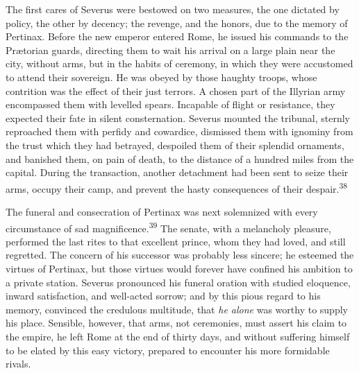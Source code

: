 The first cares of Severus were bestowed on two measures, the one
dictated by policy, the other by decency; the revenge, and the
honors, due to the memory of Pertinax. Before the new emperor
entered Rome, he issued his commands to the Prætorian guards,
directing them to wait his arrival on a large plain near the
city, without arms, but in the habits of ceremony, in which they
were accustomed to attend their sovereign. He was obeyed by those
haughty troops, whose contrition was the effect of their just
terrors. A chosen part of the Illyrian army encompassed them with
levelled spears. Incapable of flight or resistance, they expected
their fate in silent consternation. Severus mounted the tribunal,
sternly reproached them with perfidy and cowardice, dismissed
them with ignominy from the trust which they had betrayed,
despoiled them of their splendid ornaments, and banished them, on
pain of death, to the distance of a hundred miles from the
capital. During the transaction, another detachment had been sent
to seize their arms, occupy their camp, and prevent the hasty
consequences of their despair.\textsuperscript{38}


The funeral and consecration of Pertinax was next solemnized with
every circumstance of sad magnificence.\textsuperscript{39} The senate, with a
melancholy pleasure, performed the last rites to that excellent
prince, whom they had loved, and still regretted. The concern of
his successor was probably less sincere; he esteemed the virtues
of Pertinax, but those virtues would forever have confined his
ambition to a private station. Severus pronounced his funeral
oration with studied eloquence, inward satisfaction, and
well-acted sorrow; and by this pious regard to his memory,
convinced the credulous multitude, that \textit{he alone} was worthy to
supply his place. Sensible, however, that arms, not ceremonies,
must assert his claim to the empire, he left Rome at the end of
thirty days, and without suffering himself to be elated by this
easy victory, prepared to encounter his more formidable rivals.


